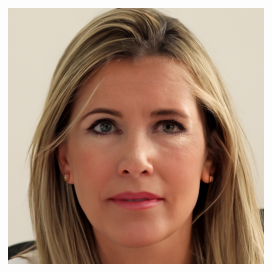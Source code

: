 \begin{figure}[H]
\begin{minipage}[b]{0.3\linewidth}
  \end{minipage}
\hspace{0.1cm}
  \begin{minipage}[b]{0.3\linewidth}
    \includegraphics[width=\linewidth]{Picture/progress/box/x_0000.png}
  \end{minipage}
\end{figure}




